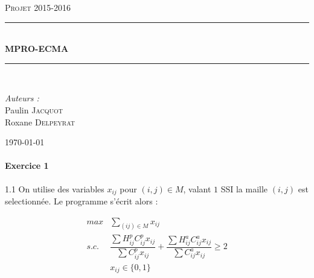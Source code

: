 \documentclass[12pt,a4paper]{article}
\newcommand{\reporttitle}{\vspace{3mm} MPRO-ECMA}
\newcommand{\reportauthor}{Paulin \textsc{Jacquot}\\Roxane \textsc{Delpeyrat}}
\newcommand{\reportsubject}{Projet 2015-2016}
\newcommand{\HRule}{\rule{\linewidth}{0.5mm}}
\begin{document}
\begin{titlepage}
	\begin{center}
		\begin{minipage}[c]{0.50\textwidth}
			\begin{flushright}
			\end{flushright}
		\end{minipage}
		\hfill
		\begin{minipage}[c]{0.50\textwidth}
			\begin{flushleft}
			\end{flushleft}
		\end{minipage}
		
		\vspace{2cm}
		
		\textsc{\Large \reportsubject}\\[0.5cm]
		\HRule \\[0.4cm]
		{\huge \bfseries \reporttitle}\\[0.4cm]
		\HRule \\[1.5cm]
		\begin{minipage}[t]{0.35\textwidth}
			\begin{flushleft} \large
				\emph{Auteurs :}\\
					\reportauthor
			\end{flushleft}
		\end{minipage}
		\vfill
		{\large \today}
	\end{center}
\end{titlepage}


\paragraph{Exercice 1\\}

1.1 On utilise des variables $x_{ij}$ pour $(i,j) \in M $, valant $1$ SSI la maille $(i,j)$ est selectionnée. Le programme s'écrit alors :

\begin{align}
max & \sum_{(ij)\in M} x_{ij} \\
s.c. \ & \dfrac{\sum H_{ij}^pC_{ij}^p x_{ij}}{\sum C_{ij}^p x_{ij}}+ \dfrac{\sum H_{ij}^a C_{ij}^a x_{ij}}{\sum C_{ij}^a x_{ij}}\geq 2 \\
& x_{ij}\in \{0,1\}
\end{align}
\end{document}
